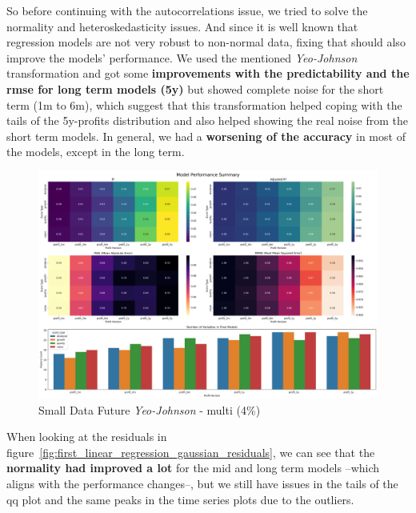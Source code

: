 \documentclass[11pt,english,a4paper,hidelinks]{book}
\begin{document}
\noindent So before continuing with the autocorrelations issue, we tried to solve the normality and heteroskedasticity issues. And since it is well known that regression models are not very robust to non-normal data, fixing that should also improve the models' performance. We used the mentioned \textit{Yeo-Johnson} transformation and got some \textbf{improvements with the predictability and the \acrshort{rmse} for long term models (5y)} but showed complete noise for the short term (1m to 6m), which suggest that this transformation helped coping with the tails of the 5y-profits distribution and also helped showing the real noise from the short term models. In general, we had a \textbf{worsening of the accuracy} in most of the models, except in the long term.

\begin{figure}[H]
    \centering
    \includegraphics[width=1\textwidth]{images/code/models/linear_regression/first_model/Small Data future - Multi Gaussian performance.png}
    \caption{Small Data Future \textit{Yeo-Johnson} - \acrshort{multi} (4\%)}
    \label{fig:first_linear_regression_gaussian}
\end{figure}

\noindent When looking at the residuals in figure~\ref{fig:first_linear_regression_gaussian_residuals}, we can see that the \textbf{normality had improved a lot} for the mid and long term models --which aligns with the performance changes--, but we still have issues in the tails of the \acrshort{qq} plot and the same peaks in the time series plots due to the outliers.
\end{document}
